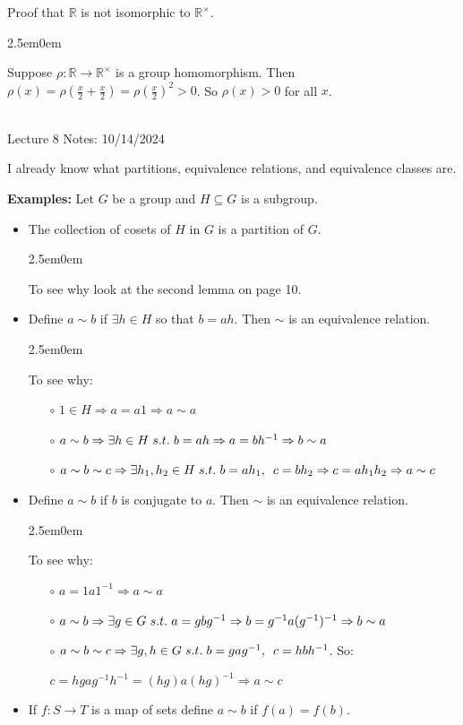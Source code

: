 \documentclass{book}
\newcommand{\hOne}{%
   \color{Black}%
   \fontsize{14}{16}\selectfont%
}
\newcommand{\exOne}{%
   \color{Purple}%
   \fontsize{13}{15}\selectfont%
}
\newcommand{\exTwo}{%
   \color{Purple}%
   \fontsize{13}{15}\selectfont%
}
\newcommand{\exP}{%
   \color{Purple}%
   \fontsize{12}{14}\selectfont%
}
\newcommand{\exTwoP}{%
   \color{RedViolet}%
   \fontsize{13}{15}\selectfont%
}
\newenvironment{myIndent}{%
   \begin{adjustwidth}{2.5em}{0em}%
}{%
   \end{adjustwidth}%
}
\newcommand{\blab}[1]{\textbf{#1}}
\newcommand{\suchthat}{ \hspace{0.3em}s.t.\hspace{0.3em}}
\newcommand{\myHS}{ \hspace{0.5em}}
\newcommand{\mySepTwo}[1][.]{%
   {\noindent\color{#1}{\rule{6.5in}{0.5mm}}}\\%
}
\newcommand{\retTwo}{\hfill\bigbreak}
\newcommand{\mHeader}[1]{{
   \color{Black}%
   \fontsize{20}{18}\selectfont%
   #1\retTwo
}}
\begin{document}
\exOne
Proof that $\mathbb{R}$ is not isomorphic to $\mathbb{R}^\times$.
\begin{myIndent}\exTwoP
	Suppose $\rho: \mathbb{R} \longrightarrow \mathbb{R}^\times$ is a group homomorphism. Then\\ $\rho(x) = \rho(\frac{x}{2} + \frac{x}{2}) = \rho(\frac{x}{2})^2 > 0$. So $\rho(x) > 0$ for all $x$.\retTwo
\end{myIndent}

\hOne
\mySepTwo

\mHeader{Lecture 8 Notes: 10/14/2024}

I already know what partitions, equivalence relations, and equivalence classes are.\retTwo


\exOne
\blab{Examples:} Let $G$ be a group and $H \subseteq G$ is a subgroup.
\begin{itemize}
	\item The collection of cosets of $H$ in $G$ is a partition of $G$.
	\begin{myIndent}\exTwo
		To see why look at the second lemma on page 10.\\
	\end{myIndent}
	\item Define $a \sim b$ if $\exists h \in H$ so that $b = ah$. Then $\sim$ is an equivalence relation.
	\begin{myIndent}\exP
		To see why:
		\begin{itemize}
			\item[$\circ$] $1 \in H \Rightarrow a = a1 \Rightarrow a \sim a$
			\item[$\circ$] $a \sim b \Rightarrow \exists h \in H \suchthat b = ah \Rightarrow a = bh^{-1} \Rightarrow b \sim a$
			\item[$\circ$] $a \sim b \sim c \Rightarrow \exists h_1, h_2 \in H \suchthat b = ah_1,\myHS c = bh_2 \Rightarrow c = ah_1h_2 \Rightarrow a \sim c$\\
		\end{itemize}
	\end{myIndent}
	\item Define $a \sim b$ if $b$ is conjugate to $a$. Then $\sim$ is an equivalence relation.
	\begin{myIndent}
		To see why:
		\begin{itemize}
			\item[$\circ$] $a = 1a1^{-1} \Rightarrow a \sim a$
			\item[$\circ$] $a \sim b \Rightarrow \exists g \in G \suchthat a = gbg^{-1} \Rightarrow b = g^{-1}a(g^{-1})^{-1} \Rightarrow b \sim a$
			\item[$\circ$] $a \sim b \sim c \Rightarrow \exists g, h \in G \suchthat b = gag^{-1},\myHS c = hbh^{-1}$. So:
			
			{\centering$c = hgag^{-1}h^{-1} = (hg)a(hg)^{-1} \Rightarrow a \sim c$\retTwo\par}
		\end{itemize}
	\end{myIndent}

	\item If $f:S\longrightarrow T$ is a map of sets define $a \sim b$ if $f(a) = f(b)$.\retTwo
\end{itemize}
\end{document}
